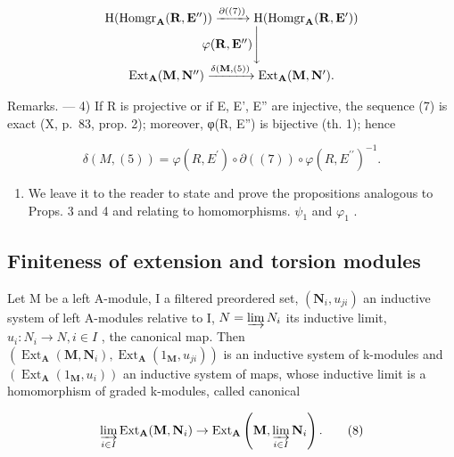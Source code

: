 \[
\begin{array}{c} \mathrm{H} (\operatorname{Homgr} _ {\mathbf {A}} (\mathbf {R}, \mathbf {E} ^ {\prime \prime})) \xrightarrow {\partial ((7))} \mathrm{H} (\operatorname{Homgr} _ {\mathbf {A}} (\mathbf {R}, \mathbf {E} ^ {\prime})) \\ \varphi (\mathbf {R}, \mathbf {E} ^ {\prime \prime}) \Biggl \downarrow \\ \operatorname{Ext} _ {\mathbf {A}} (\mathbf {M}, \mathbf {N} ^ {\prime \prime}) \xrightarrow {\delta (\mathbf {M} , (5))} \operatorname{Ext} _ {\mathbf {A}} (\mathbf {M}, \mathbf {N} ^ {\prime}). \end{array}
\]

Remarks. --- 4) If R is projective or if E, E', E'' are injective, the sequence (7) is exact (X, p.~83, prop. 2); moreover, φ(R, E'') is bijective (th. 1); hence

\[
\delta (M, (5)) = \varphi (R, E ^ {\prime}) \circ \partial ((7)) \circ \varphi (R, E ^ {\prime \prime}) ^ {- 1}.
\]

\begin{enumerate}
\def\labelenumi{\arabic{enumi})}
\setcounter{enumi}{4}
\tightlist
\item
  We leave it to the reader to state and prove the propositions analogous to Props. 3 and 4 and relating to homomorphisms. \(\psi_{1}\) and \(\varphi_{1}\) .
\end{enumerate}

\subsection{Finiteness of extension and torsion modules}

Let M be a left A-module, I a filtered preordered set, \((\mathbf{N}_{i}, u_{ji})\) an inductive system of left A-modules relative to I, \(N = \varinjlim N_{i}\) its inductive limit, \(u_{i}: N_{i} \to N, i \in I\) , the canonical map. Then \((\operatorname{Ext}_{\mathbf{A}}(\mathbf{M}, \mathbf{N}_{i}), \operatorname{Ext}_{\mathbf{A}}(1_{\mathbf{M}}, u_{ji}))\) is an inductive system of k-modules and \((\operatorname{Ext}_{\mathbf{A}}(1_{\mathbf{M}}, u_{i}))\) an inductive system of maps, whose inductive limit is a homomorphism of graded k-modules, called canonical

\[
\varinjlim_ {i \in I} \operatorname{Ext} _ {\mathbf {A}} (\mathbf {M}, \mathbf {N} _ {i}) \rightarrow \operatorname{Ext} _ {\mathbf {A}} \left(\mathbf {M}, \varinjlim_ {i \in I} \mathbf {N} _ {i}\right).\tag{8}
\]

